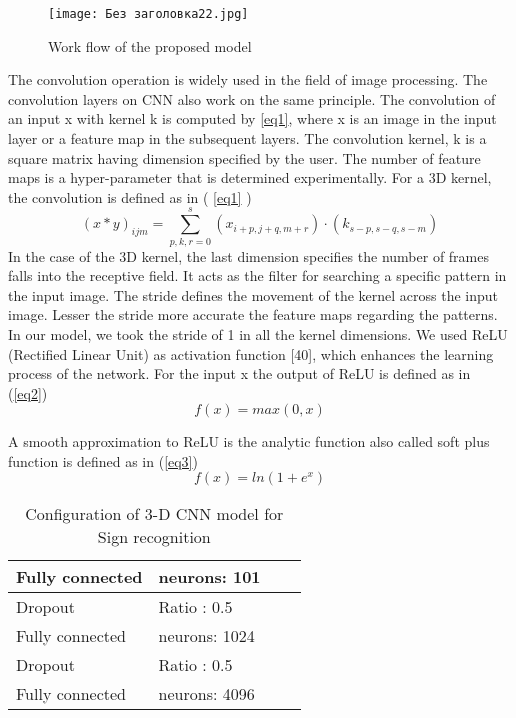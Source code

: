 \documentclass[
  manuscript=article,  %
  layout=preprint,  %
  year=20xx,
  volume=x,
]{ledger}
\begin{document}
\begin{figure}[h!]
    \centering
    \texttt{[image: Без заголовка22.jpg]}
    \caption{Work flow of the proposed model}
    \label{f2}
\end{figure}



The convolution operation is widely used in the field of image processing. The convolution layers on CNN also work on the same principle. The convolution of an input x with kernel k is computed by \ref{eq1}, where x is an image in the input layer or a feature map in the subsequent layers. The convolution kernel, k is a square matrix having dimension specified by the user. The number of feature maps is a hyper-parameter that is determined experimentally. For a 3D kernel, the convolution is defined as in ( \ref{eq1} )
\begin{equation}
(x*y)_{ijm}=\sum^s_{p,k,r=0} (x_{i+p,j+q,m+r})\cdot (k_{s-p, s-q, s-m}) \label{eq1}
\end{equation}
In the case of the 3D kernel, the last dimension specifies the number of frames falls into the receptive field. It acts as the filter for searching a specific pattern in the input image. The stride defines the movement of the kernel across the input image. Lesser the stride more accurate the feature maps regarding the patterns. In our model, we took the stride of 1 in all the kernel dimensions. We used ReLU (Rectified Linear Unit) as activation function [40], which enhances the learning process of the network. For the input x the output of ReLU is defined as in (\ref{eq2})
\begin{equation}
f(x)=max(0,x) \label{eq2}
\end{equation}

A smooth approximation to ReLU is the analytic function also called soft plus function is defined as in (\ref{eq3})
\begin{equation}
f (x) = ln(1 + e^x) \label{eq3}
\end{equation}








\begin{table}[!ht]
\caption{ Configuration of 3-D CNN model for Sign recognition\label{tab1}}
\begin{tabular*}{\columnwidth}{@{\extracolsep\fill}llll@{\extracolsep\fill}}
\toprule
Fully connected & neurons: 101\\
\midrule
Dropout & Ratio : 0.5 \\
Fully connected & neurons: 1024 \\
Dropout & Ratio : 0.5 \\
Fully connected & neurons: 4096\\
\bottomrule
\end{tabular*}
\end{table}
\end{document}
